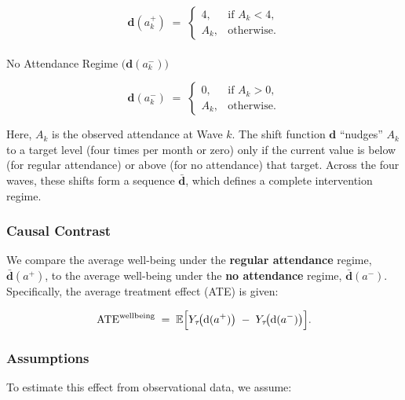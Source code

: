 \documentclass[
  single column]{article}
\makeatletter
\let\oldparagraph\paragraph
\renewcommand{\paragraph}{
    \@ifstar
      \xxxParagraphStar
      \xxxParagraphNoStar
  }
\newcommand{\xxxParagraphStar}[1]{\oldparagraph*{#1}\mbox{}}
\newcommand{\xxxParagraphNoStar}[1]{\oldparagraph{#1}\mbox{}}
\makeatother
\begin{document}
\[
\boldsymbol{\text{d}} (a_k^+) 
\;=\; 
\begin{cases}
4, & \text{if } A_k < 4,\\[6pt]
A_k, & \text{otherwise.}
\end{cases}
\]

\paragraph{\texorpdfstring{No Attendance Regime
\(\bigl(\boldsymbol{\text{d}}(a_k^-)\bigr)\)}{No Attendance Regime \textbackslash bigl(\textbackslash boldsymbol\{\textbackslash text\{d\}\}(a\_k\^{}-)\textbackslash bigr)}}\label{no-attendance-regime-biglboldsymboltextda_k-bigr}

\[
\boldsymbol{\text{d}}(a_k^-) 
\;=\; 
\begin{cases}
0, & \text{if } A_k > 0,\\[6pt]
A_k, & \text{otherwise.}
\end{cases}
\]

Here, \(A_k\) is the observed attendance at Wave \(k\). The shift
function \(\boldsymbol{\text{d}}\) ``nudges'' \(A_k\) to a target level
(four times per month or zero) only if the current value is below (for
regular attendance) or above (for no attendance) that target. Across the
four waves, these shifts form a sequence
\(\boldsymbol{\bar{\boldsymbol{\text{d}}}}\), which defines a complete
intervention regime.

\subsubsection{Causal Contrast}\label{causal-contrast}

We compare the average well-being under the \textbf{regular attendance}
regime, \(\boldsymbol{\bar{\boldsymbol{\text{d}}}}(a^+)\), to the
average well-being under the \textbf{no attendance} regime,
\(\boldsymbol{\bar{\boldsymbol{\text{d}}}}(a^-)\). Specifically, the
average treatment effect (ATE) is given:

\[
\text{ATE}^{\text{wellbeing}} 
\;=\; 
\mathbb{E}
\Bigl[
  Y_\tau\!\bigl(\boldsymbol{\text{d}}(a^+)\bigr) 
  \;-\; 
  Y_\tau\!\bigl(\boldsymbol{\text{d}}(a^-)\bigr)
\Bigr].
\]

\subsubsection{Assumptions}\label{assumptions}

To estimate this effect from observational data, we assume:
\end{document}
